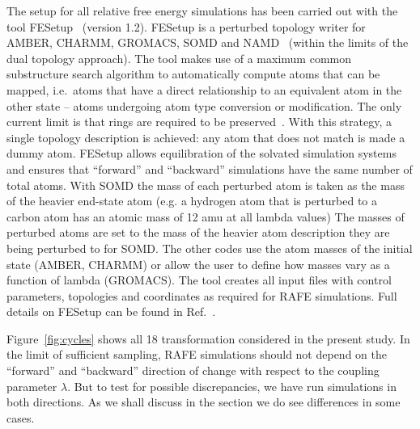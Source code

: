 \documentclass[journal=jctcce,manuscript=article]{achemso}
\begin{document}
The setup for all relative free energy simulations has been carried
out with the tool FESetup~\cite{loeffler_fesetup:_2015} (version
1.2).  FESetup is a perturbed topology writer for AMBER, CHARMM,
GROMACS, SOMD and NAMD~\cite{JCC:JCC20289} (within the
limits of the dual topology approach).  The tool makes use of a
maximum common substructure search algorithm to automatically compute
atoms that can be mapped, i.e.\ atoms that have a direct relationship
to an equivalent atom in the other state -- atoms undergoing atom type conversion or modification.  The only current limit is that rings are
required to be preserved~\cite{doi:10.1021/acs.jcim.5b00057}.  With this
strategy, a single topology description is achieved: any atom that
does not match is made a dummy atom.  FESetup allows
equilibration of the solvated simulation systems and ensures that
``forward'' and ``backward'' simulations have the same number of
total atoms.  With SOMD the mass of each perturbed atom is taken as the mass of the heavier end-state atom (e.g. a hydrogen atom that is perturbed to a carbon atom has an atomic mass of 12 amu at all lambda values)  The masses of perturbed atoms are set to the mass of the heavier atom description  they are being perturbed to for SOMD.  The other codes use the atom masses of the initial state (AMBER, CHARMM) or allow the user to define how masses vary as a function of lambda (GROMACS).
The tool creates all input files with control
parameters, topologies and coordinates as required for RAFE
simulations.  Full details on FESetup can be found in
Ref.~.

Figure~\ref{fig:cycles} shows all 18 transformation considered in the present study.
In the limit of sufficient sampling, RAFE simulations should not depend on the ``forward'' and ``backward'' direction of change with respect to the coupling 
parameter $\lambda$. But to test for possible discrepancies, we have run 
simulations in both directions.  As we shall discuss in the 
 section we do see differences in some cases.
\end{document}
